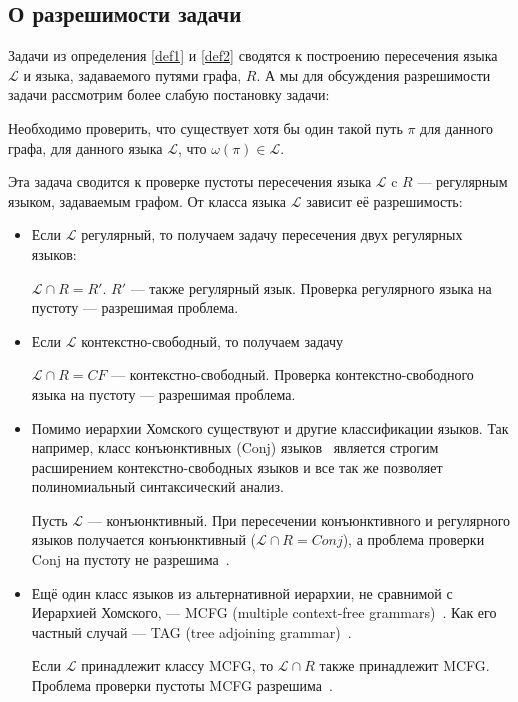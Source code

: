 \subsection{О разрешимости задачи}

Задачи из определения \ref{def1} и \ref{def2} сводятся к построению пересечения языка $\mathcal{L}$ и языка, задаваемого путями графа, $R$. 
А мы для обсуждения разрешимости задачи рассмотрим более слабую постановку задачи:

\begin{definition}
	Необходимо проверить, что существует хотя бы один такой путь $\pi$ для данного графа, для данного языка $\mathcal{L}$, что $\omega(\pi) \in \mathcal{L}$.
	
\end{definition}

Эта задача сводится к проверке пустоты пересечения языка $\mathcal{L}$ c $R$ --- регулярным языком, задаваемым графом. От класса языка $\mathcal{L}$ зависит её разрешимость:

\begin{itemize}
	\item Если $\mathcal{L}$ регулярный, то получаем задачу пересечения двух регулярных языков: 
	
	$\mathcal{L} \cap R = R'$.
	$R'$ --- также регулярный язык.
	Проверка регулярного языка на пустоту --- разрешимая проблема.
	
	\item Если $\mathcal{L}$ контекстно-свободный, то получаем задачу
	
	$\mathcal{L} \cap R = CF$ --- контекстно-свободный.
	Проверка контекстно-свободного языка на пустоту --- разрешимая проблема.
	
	\item Помимо иерархии Хомского существуют и другие классификации языков.
	Так например, класс конъюнктивных (Conj)
	языков~\cite{DBLP:journals/jalc/Okhotin01}
	является строгим расширением контекстно-свободных языков и все так же позволяет полиномиальный синтаксический анализ.
	
	Пусть $\mathcal{L}$ --- конъюнктивный. При пересечении конъюнктивного и регулярного языков получается конъюнктивный ($\mathcal{L} \cap R = Conj$), а проблема проверки Conj на пустоту не разрешима~\cite{DBLP:journals/tcs/Okhotin03a}.
	
	\item Ещё один класс языков из альтернативной иерархии, не сравнимой с Иерархией Хомского, --- MCFG (multiple context-free grammars)~\cite{SEKI1991191}.
	Как его частный случай --- TAG (tree adjoining grammar)~\cite{Joshi1997}.
	
	Если $\mathcal{L}$ принадлежит классу MCFG, то $\mathcal{L} \cap R$ также принадлежит MCFG. Проблема проверки пустоты MCFG разрешима~\cite{SEKI1991191}.
	
\end{itemize}

